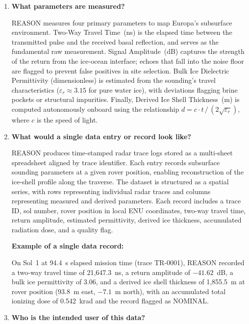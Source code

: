 \documentclass[11pt]{article}
\begin{document}
\begin{enumerate}[label=\Roman*., leftmargin=2.5em, itemsep=0.75em]

    \item \textbf{What parameters are measured?}

    REASON measures four primary parameters to map Europa's subsurface environment.
    Two-Way Travel Time~(ns) is the elapsed time between the transmitted pulse and the
    received basal reflection, and serves as the fundamental raw measurement. Signal
    Amplitude~(dB) captures the strength of the return from the ice-ocean interface;
    echoes that fall into the noise floor are flagged to prevent false positives in site
    selection. Bulk Ice Dielectric Permittivity (dimensionless) is estimated from the
    sounding's travel characteristics ($\varepsilon_r \approx 3.15$ for pure water ice),
    with deviations flagging brine pockets or structural impurities. Finally, Derived Ice
    Shell Thickness~(m) is computed autonomously onboard using the relationship
    $d = c \cdot t\, /\, (2\sqrt{\varepsilon_r})$, where $c$ is the speed of light.

    \item \textbf{What would a single data entry or record look like?}

    REASON produces time-stamped radar trace logs stored as a multi-sheet spreadsheet
    aligned by trace identifier. Each entry records subsurface sounding parameters at a
    given rover position, enabling reconstruction of the ice-shell profile along the
    traverse. The dataset is structured as a spatial series, with rows representing
    individual radar traces and columns representing measured and derived parameters.
    Each record includes a trace ID, sol number, rover position in local ENU coordinates,
    two-way travel time, return amplitude, estimated permittivity, derived ice thickness,
    accumulated radiation dose, and a quality flag.

    \textbf{Example of a single data record:}

    On Sol~1 at 94.4~s elapsed mission time (trace TR-0001), REASON recorded a two-way
    travel time of 21{,}647.3~ns, a return amplitude of $-41.62$~dB, a bulk ice
    permittivity of 3.06, and a derived ice shell thickness of 1{,}855.5~m at rover
    position (93.8~m east, $-7.1$~m north), with an accumulated total ionizing dose of
    0.542~krad and the record flagged as NOMINAL.

    \item \textbf{Who is the intended user of this data?}


\end{enumerate}
\end{document}
